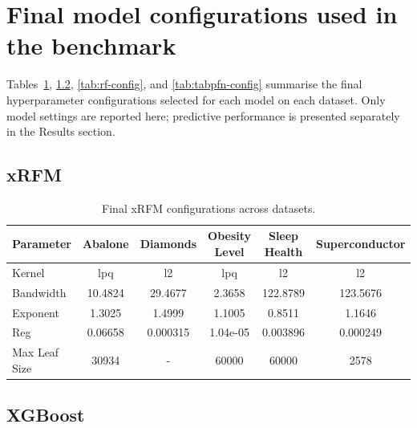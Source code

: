 \section{Final model configurations used in the benchmark}
\label{app:final-configs}

Tables~\ref{tab:xrfm-config}, \ref{tab:xgb-config}, \ref{tab:rf-config}, and \ref{tab:tabpfn-config} summarise the final hyperparameter configurations selected for each model on each dataset. Only model settings are reported here; predictive performance is presented separately in the Results section.

\subsection{xRFM}
\label{tab:xrfm-config}

\begin{table}[h]
  \centering
  \small
  \setlength{\tabcolsep}{5pt}
  \caption{Final xRFM configurations across datasets.}
  \label{tab:xrfm-config}
  \begin{tabular}{lccccc}
    \toprule
    \textbf{Parameter} & \textbf{Abalone} & \textbf{Diamonds} & \textbf{Obesity Level} & \textbf{Sleep Health} & \textbf{Superconductor} \\
    \midrule
    Kernel     & lpq        & l2         & lpq        & l2         & l2 \\
    Bandwidth  & 10.4824    & 29.4677    & 2.3658     & 122.8789   & 123.5676 \\
    Exponent   & 1.3025     & 1.4999     & 1.1005     & 0.8511     & 1.1646 \\
    Reg        & 0.06658    & 0.000315   & 1.04e-05   & 0.003896   & 0.000249 \\
    Max Leaf Size & 30934    & -         & 60000      & 60000      & 2578 \\
    \bottomrule
  \end{tabular}
\end{table}

\subsection{XGBoost}
\label{tab:xgb-config}

